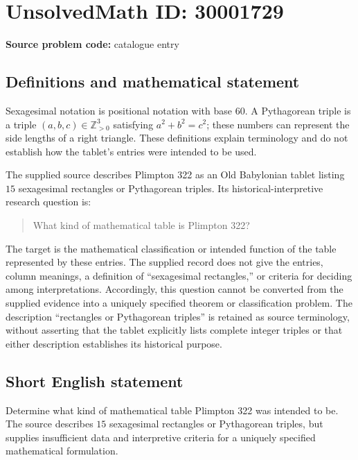 \documentclass[11pt]{article}
\newcommand{\Z}{\mathbb{Z}}
\begin{document}
\section*{UnsolvedMath ID: 30001729}
\textbf{Source problem code:} catalogue entry
\subsection{Definitions and mathematical statement}
Sexagesimal notation is positional notation with base \(60\). A Pythagorean triple is a triple \((a,b,c)\in\Z_{>0}^{3}\) satisfying \(a^{2}+b^{2}=c^{2}\); these numbers can represent the side lengths of a right triangle. These definitions explain terminology and do not establish how the tablet's entries were intended to be used.

The supplied source describes Plimpton 322 as an Old Babylonian tablet listing \(15\) sexagesimal rectangles or Pythagorean triples. Its historical-interpretive research question is:
\begin{quote}
What kind of mathematical table is Plimpton 322?
\end{quote}
The target is the mathematical classification or intended function of the table represented by these entries. The supplied record does not give the entries, column meanings, a definition of ``sexagesimal rectangles,'' or criteria for deciding among interpretations. Accordingly, this question cannot be converted from the supplied evidence into a uniquely specified theorem or classification problem. The description ``rectangles or Pythagorean triples'' is retained as source terminology, without asserting that the tablet explicitly lists complete integer triples or that either description establishes its historical purpose.
\subsection{Short English statement}
Determine what kind of mathematical table Plimpton 322 was intended to be. The source describes \(15\) sexagesimal rectangles or Pythagorean triples, but supplies insufficient data and interpretive criteria for a uniquely specified mathematical formulation.
\end{document}
